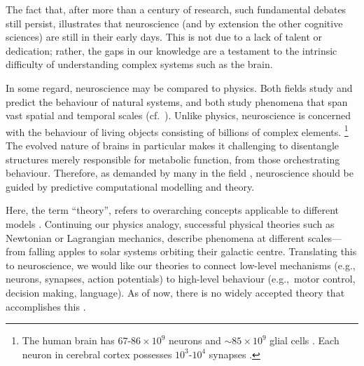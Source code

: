 The fact that,  after more than a century of research, such fundamental debates still persist, illustrates that neuroscience (and by extension the other cognitive sciences) are still in their early days.
This is not due to a lack of talent or dedication;
rather, the gaps in our knowledge are a testament to the intrinsic difficulty of understanding complex systems such as the brain.

In some regard, neuroscience may be compared to physics.
Both fields study and predict the behaviour of natural systems, and both study phenomena that span vast spatial and temporal scales
(cf.~).
Unlike physics, neuroscience is concerned with the behaviour of living objects consisting of billions of complex elements.%
\footnote{The human brain has $67$-$86\times10^{9}$ neurons and $\sim$$85\times10^9$ glial cells \citep{vonbartheld2016search}. Each neuron in cerebral cortex possesses $10^3$-$10^4$ synapses \citep[Chapter~6]{braitenberg2013anatomy}.}
The evolved nature of brains in particular makes it challenging to disentangle structures merely responsible for metabolic function, from those orchestrating behaviour.
Therefore, as demanded by many in the field \citep[e.g.,][]{marr1982vision,churchland1992computational,eliasmith2003neural}, neuroscience should be guided by predictive computational modelling and theory.%

Here, the term \enquote{theory}, refers to overarching concepts applicable to different models \citep[e.g.,][]{stevens2000models}.
Continuing our physics analogy, successful physical theories such as Newtonian or Lagrangian mechanics, describe phenomena at different scales---from falling apples to solar systems orbiting their galactic centre.
Translating this to neuroscience, we would like our theories to connect low-level mechanisms (e.g., neurons, synapses, action potentials) to high-level behaviour (e.g.,~motor control, decision making, language).
As of now, there is no widely accepted theory that accomplishes this \citep[Chapter~9]{eliasmith2013how}.

